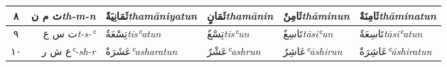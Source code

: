 \documentclass[11pt, a4paper]{article}
\begin{document}
\begin{center}
\begin{threeparttable}
\begin{tabular}{ C R A A A A }
			{\Large\textarabic{٨}}                        &
			{\Large\textarabic{ث م ن}}\newline \textit{\small th-m-n}                &
			{\Large\textarabic{ثَمَانِيَةٌ}}\newline \textit{\small thamāniyatun}         &
			{\Large\textarabic{ثَمَانٍ}}\newline \textit{\small thamānin}    &
			{\Large\textarabic{ثَامِنٌ}}\newline \textit{\small thāminun}               &
			{\Large\textarabic{ثَامِنَةٌ}}\newline \textit{\small thāminatun}                                                                                                                                 \\
			\midrule

			{\Large\textarabic{٩}}                        &
			{\Large\textarabic{ت س ع}}\newline \textit{\small t-s-ʿ}                 &
			{\Large\textarabic{تِسْعَةٌ}}\newline \textit{\small tisʿatun}               &
			{\Large\textarabic{تِسْعٌ}}\newline \textit{\small tisʿun}                  &
			{\Large\textarabic{تَاسِعٌ}}\newline \textit{\small tāsiʿun}                &
			{\Large\textarabic{تَاسِعَةٌ}}\newline \textit{\small tāsiʿatun}                                                                                                                                  \\
			\midrule

			{\Large\textarabic{١٠}}                      &
			{\Large\textarabic{ع ش ر}}\newline \textit{\small ʿ-sh-r}                &
			{\Large\textarabic{عَشَرَةٌ}}\newline \textit{\small ʿasharatun}  &
			{\Large\textarabic{عَشْرٌ}}\newline \textit{\small ʿashrun}      &
			{\Large\textarabic{عَاشِرٌ}}\newline \textit{\small ʿāshirun}               &
			{\Large\textarabic{عَاشِرَةٌ}}\newline \textit{\small ʿāshiratun}                                                                                                                                 \\


\end{tabular}
\end{threeparttable}
\end{center}
\end{document}
